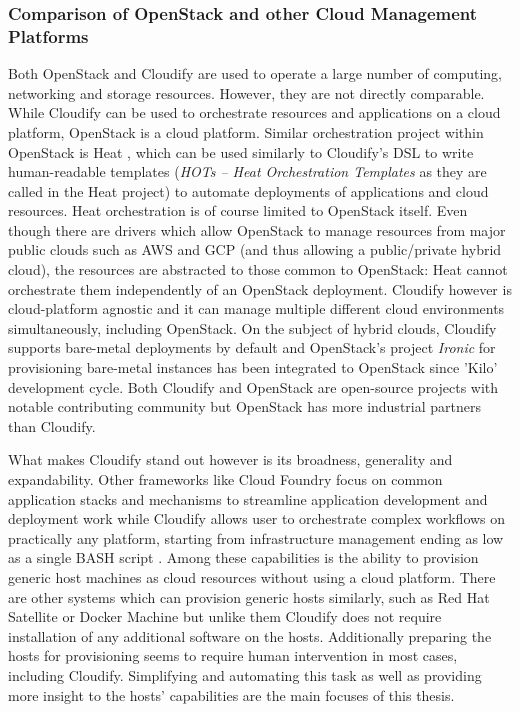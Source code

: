 \subsubsection{Comparison of OpenStack and other Cloud Management Platforms}

Both OpenStack and Cloudify are used to operate a large number of computing, networking and storage resources. However, they are not directly comparable. While Cloudify can be used to orchestrate resources and applications on a cloud platform, OpenStack is a cloud platform. Similar orchestration project within OpenStack is Heat \cite{heat}, which can be used similarly to Cloudify's DSL to write human-readable templates (\textit{HOTs -- Heat Orchestration Templates} as they are called in the Heat project) to automate deployments of applications and cloud resources. Heat orchestration is of course limited to OpenStack itself. Even though there are drivers which allow OpenStack to manage resources from major public clouds such as AWS and GCP (and thus allowing a public/private hybrid cloud), the resources are abstracted to those common to OpenStack: Heat cannot orchestrate them independently of an OpenStack deployment. Cloudify however is cloud-platform agnostic and it can manage multiple different cloud environments simultaneously, including OpenStack. On the subject of hybrid clouds, Cloudify supports bare-metal deployments by default and OpenStack's project \textit{Ironic} for provisioning bare-metal instances has  been integrated to OpenStack since 'Kilo' development cycle.
Both Cloudify and OpenStack are open-source projects with notable contributing community but OpenStack has more industrial partners than Cloudify. 

What makes Cloudify stand out however is its broadness, generality and expandability. Other frameworks like Cloud Foundry focus on common application stacks and mechanisms to streamline application development and deployment work while Cloudify allows user to orchestrate complex workflows on practically any platform, starting from infrastructure management ending as low as a single BASH script \cite{cloudifyfaq}. Among these capabilities is the ability to provision generic host machines as cloud resources without using a cloud platform. There are other systems which can provision generic hosts similarly, such as Red Hat Satellite \cite{redhatsatellite} or Docker Machine \cite{dockermachine} but unlike them Cloudify does not require installation of any additional software on the hosts. Additionally preparing the hosts for provisioning seems to require human intervention in most cases, including Cloudify. Simplifying and automating this task as well as providing more insight to the hosts' capabilities  are the main focuses of this thesis.

\pagebreak
